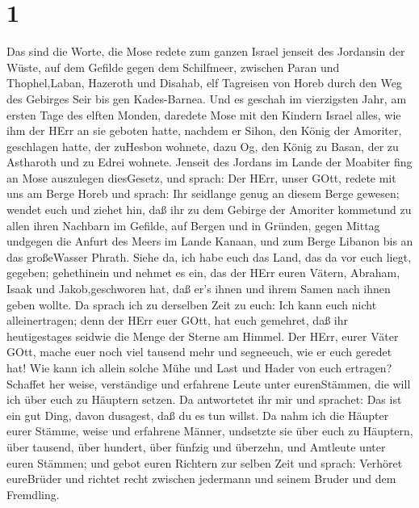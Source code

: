 \hypertarget{section}{%
\section{1}\label{section}}

 Das sind die Worte, die Mose redete zum ganzen Israel
jenseit des Jordansin der Wüste, auf dem Gefilde gegen dem Schilfmeer,
zwischen Paran und Thophel,Laban, Hazeroth und Disahab,  elf
Tagreisen von Horeb durch den Weg des Gebirges Seir bis gen
Kades-Barnea.  Und es geschah im vierzigsten Jahr, am ersten
Tage des elften Monden, daredete Mose mit den Kindern Israel alles, wie
ihm der HErr an sie geboten hatte,  nachdem er Sihon, den
König der Amoriter, geschlagen hatte, der zuHesbon wohnete, dazu Og, den
König zu Basan, der zu Astharoth und zu Edrei wohnete. 
Jenseit des Jordans im Lande der Moabiter fing an Mose auszulegen
diesGesetz, und sprach:  Der HErr, unser GOtt, redete mit
uns am Berge Horeb und sprach: Ihr seidlange genug an diesem Berge
gewesen;  wendet euch und ziehet hin, daß ihr zu dem Gebirge
der Amoriter kommetund zu allen ihren Nachbarn im Gefilde, auf Bergen
und in Gründen, gegen Mittag undgegen die Anfurt des Meers im Lande
Kanaan, und zum Berge Libanon bis an das großeWasser Phrath.
 Siehe da, ich habe euch das Land, das da vor euch liegt,
gegeben; gehethinein und nehmet es ein, das der HErr euren Vätern,
Abraham, Isaak und Jakob,geschworen hat, daß er's ihnen und ihrem Samen
nach ihnen geben wollte.  Da sprach ich zu derselben Zeit zu
euch: Ich kann euch nicht alleinertragen;  denn der HErr
euer GOtt, hat euch gemehret, daß ihr heutigestages seidwie die Menge
der Sterne am Himmel.  Der HErr, eurer Väter GOtt, mache
euer noch viel tausend mehr und segneeuch, wie er euch geredet hat!
 Wie kann ich allein solche Mühe und Last und Hader von
euch ertragen?  Schaffet her weise, verständige und
erfahrene Leute unter eurenStämmen, die will ich über euch zu Häuptern
setzen.  Da antwortetet ihr mir und sprachet: Das ist ein
gut Ding, davon dusagest, daß du es tun willst.  Da nahm
ich die Häupter eurer Stämme, weise und erfahrene Männer, undsetzte sie
über euch zu Häuptern, über tausend, über hundert, über fünfzig und
überzehn, und Amtleute unter euren Stämmen;  und gebot
euren Richtern zur selben Zeit und sprach: Verhöret eureBrüder und
richtet recht zwischen jedermann und seinem Bruder und dem Fremdling.
